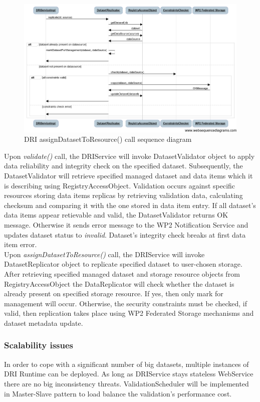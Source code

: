 \documentclass[a4paper,12pt,titlepage]{article}
\begin{document}
\begin{figure}[h!]
	\centering
	\includegraphics[width=1.0\textwidth]{img/replication-diagram.png}
	\caption{DRI assignDatasetToResource() call sequence diagram}
	\label{fig:replication-diagram}
\end{figure}

\noindent
Upon \textit{validate()} call, the DRIService will invoke DatasetValidator object to apply data reliability and integrity check on the specified dataset. Subsequently, the DatasetValidator will retrieve specified managed dataset and data items which it is describing using RegistryAccessObject. Validation occurs against specific resources storing data items replicas by retrieving validation data, calculating checksum and comparing it with the one stored in data item entry. If all dataset's data items appear retievable and valid, the DatasetValidator returns OK message. Otherwise it sends error message to the WP2 Notification Service and updates dataset status to \textit{invalid}. Dataset's integrity check breaks at first data item error.\\

\noindent
Upon \textit{assignDatasetToResource()} call, the DRIService will invoke DatasetReplicator object to replicate specified dataset to user-chosen storage. After retrieving specified managed dataset and storage resource objects from RegistryAccessObject the DataReplicator will check whether the dataset is already present on specified storage resource. If yes, then only mark for management will occur. Otherwise, the security constraints must be checked, if valid, then replication takes place using WP2 Federated Storage mechanisms and dataset metadata update.

\subsubsection{Scalability issues}
In order to cope with a significant number of big datasets, multiple instances of DRI Runtime can be deployed. As long as DRIService stays stateless WebService there are no big inconsistency threats. ValidationScheduler will be implemented in Master-Slave pattern to load balance the validation's performance cost.
\end{document}
